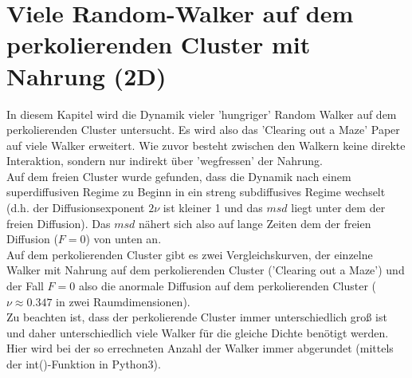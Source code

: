 \documentclass[a4paper, 12pt]{report}
\begin{document}
\chapter{Viele Random-Walker auf dem perkolierenden Cluster mit Nahrung (2D)}
In diesem Kapitel wird die Dynamik vieler 'hungriger' Random Walker auf dem perkolierenden Cluster untersucht. Es wird also das 'Clearing out a Maze' Paper auf viele Walker erweitert. Wie zuvor besteht zwischen den Walkern keine direkte Interaktion, sondern nur indirekt über 'wegfressen' der Nahrung.
\\
\noindent Auf dem freien Cluster wurde gefunden, dass die Dynamik nach einem superdiffusiven Regime zu Beginn in ein streng subdiffusives Regime wechselt (d.h. der Diffusionsexponent $2\nu$ ist kleiner 1 und das $msd$ liegt unter dem der freien Diffusion). Das $msd$ nähert sich also auf lange Zeiten dem der freien Diffusion ($F=0$) von unten an.
\\
\noindent Auf dem perkolierenden Cluster gibt es zwei Vergleichskurven, der einzelne Walker mit Nahrung auf dem perkolierenden Cluster ('Clearing out a Maze') und der Fall $F=0$ also die anormale Diffusion auf dem perkolierenden Cluster ($\nu \approx 0.347$ in zwei Raumdimensionen).
\\
\noindent Zu beachten ist, dass der perkolierende Cluster immer unterschiedlich groß ist und daher unterschiedlich viele Walker für die gleiche Dichte benötigt werden. Hier wird bei der so errechneten Anzahl der Walker immer abgerundet (mittels der int()-Funktion in Python3).











\end{document}
